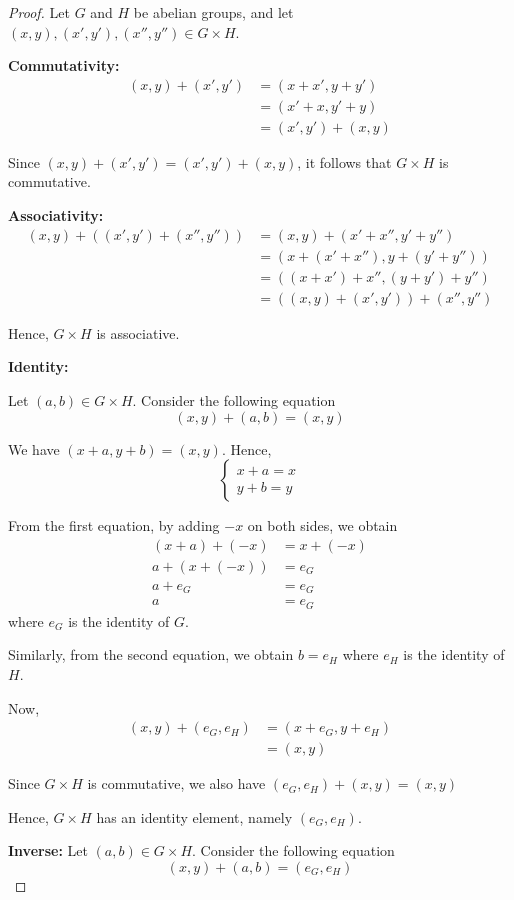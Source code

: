 \documentclass{article}
\begin{document}
\begin{proof}
Let $G$ and $H$ be abelian groups, and let
$(x,y),(x',y'),(x'',y'') \in G \times H$.

\textbf{Commutativity:} 
\begin{align*}
(x,y)+(x',y')&=(x+x',y+y')\\
&=(x'+x,y'+y)\\
&=(x',y')+(x,y)
\end{align*}

Since $(x,y)+(x',y')=(x',y')+(x,y)$, it follows that
$G \times H$ is commutative.

\textbf{Associativity:}
\begin{align*}
(x,y)+((x',y')+(x'',y''))&=(x,y)+(x'+x'',y'+y'')\\
&=(x+(x'+x''),y+(y'+y''))\\
&=((x+x')+x'',(y+y')+y'')\\
&=((x,y)+(x',y'))+(x'',y'')
\end{align*}

Hence, $G \times H$ is associative.

\textbf{Identity:}

Let $(a,b) \in G \times H$. Consider the following equation
\[
(x,y)+(a,b)=(x,y)
\]

We have $(x+a,y+b)=(x,y)$. Hence,
\[
\begin{cases}
x+a=x\\
y+b=y
\end{cases}
\]

From the first equation, by adding $-x$ on both sides, we obtain
\begin{align*}
(x+a)+(-x)&=x+(-x)\\
a+(x+(-x))&=e_G\\
a+e_G&=e_G\\
a&=e_G
\end{align*}
where $e_G$ is the identity of $G$.

Similarly, from the second equation, we obtain $b=e_H$ where $e_H$
is the identity of $H$.

Now,
\begin{align*}
(x,y)+(e_G,e_H)&=(x+e_G,y+e_H)\\
&=(x,y)
\end{align*}

Since $G \times H$ is commutative, we also have
$(e_G,e_H)+(x,y)=(x,y)$

Hence, $G \times H$ has an identity element, namely $(e_G,e_H)$.

\textbf{Inverse:}
Let $(a,b) \in G \times H$. Consider the following equation
\[
(x,y)+(a,b)=(e_G,e_H)
\]


\end{proof}
\end{document}
